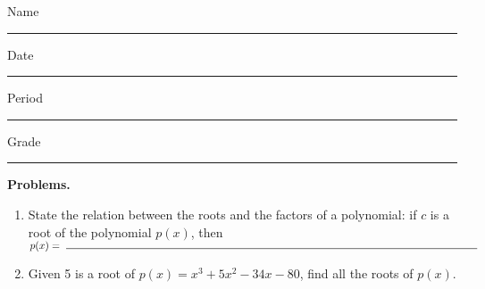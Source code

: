 \documentclass[10pt]{article}
\title{}
\date{}
\begin{document}
\noindent
{
Name \rule{16em}{.5pt} Date \rule{8em}{.5pt} Period \rule{4em}{.5pt} Grade  \rule{4em}{.5pt}
}
\vspace{1em}

{\noindent\bf Problems.}

\begin{enumerate}
    \item State the relation between the roots and the factors of a polynomial: if $c$ is a root of the polynomial \(p(x)\), then\\[1em] \(\displaystyle p(x) =\ \rule{40em}{0.5pt}\)
    \item Given 5 is a root of \(p(x) =x^3 + 5 x^2 - 34 x - 80\), find all the roots of \(p(x)\).
\end{enumerate}
\end{document}
